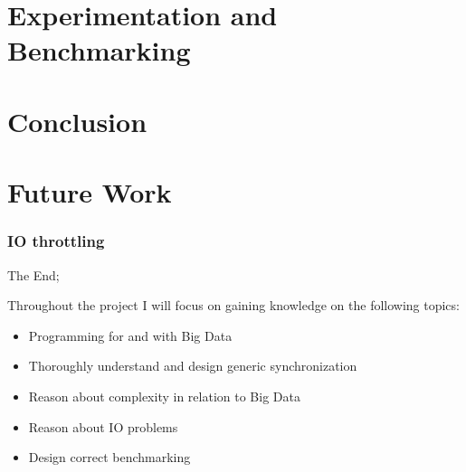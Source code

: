 \documentclass[a4paper]{article}
\begin{document}
\section{Experimentation and Benchmarking}


\section{Conclusion}


\section{Future Work}
\subsubsection{IO throttling}








The End;

Throughout the project I will focus on gaining knowledge on the following topics:

\begin{itemize}
  \item Programming for and with Big Data
  \item Thoroughly understand and design generic synchronization
  \item Reason about complexity in relation to Big Data
  \item Reason about IO problems  
  \item Design correct benchmarking
\end{itemize}
\end{document}
